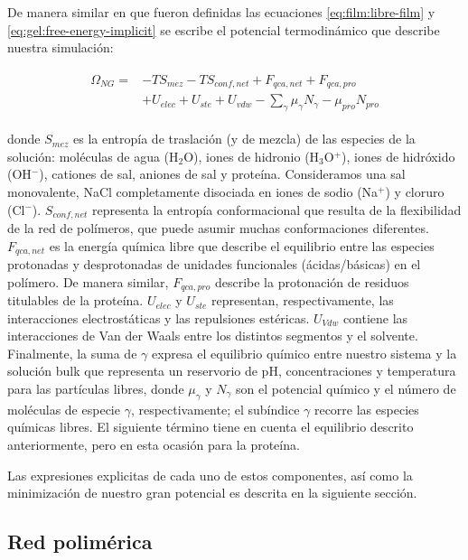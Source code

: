 De manera similar en que fueron definidas las ecuaciones \ref{eq:film:libre-film} y \ref{eq:gel:free-energy-implicit} se escribe el potencial termodin\'amico que describe nuestra simulaci\'on:

\begin{align}
\begin{aligned}
\Omega_{NG}=& -TS_{mez} -TS_{conf,net} + F_{qca,net} + F_{qca,pro}\\
& + U_{elec} + U_{ste} + U_{vdw} - \sum_{\gamma}{\mu_\gamma N_\gamma} - \mu_{pro} N_{pro}
\end{aligned}
\label{eq:esf:semicano}
\end{align}


\noindent donde $S_{mez}$ es la entrop\'ia de traslaci\'on (y de mezcla) de las especies de la soluci\'on: mol\'eculas de agua (H$_2$O), iones de hidronio (H$_3$O$^+$), iones de hidr\'oxido (OH$^- $), cationes de sal, aniones de sal y prote\'ina.
Consideramos una sal monovalente, NaCl completamente disociada en iones de sodio (Na$^+$) y cloruro (Cl$^-$).
$S_{conf,net}$ representa la entrop\'ia conformacional que resulta de la flexibilidad de la red de pol\'imeros, que puede asumir muchas conformaciones diferentes.
$F_{qca,net}$ es la energ\'ia qu\'imica libre que describe el equilibrio entre las especies protonadas y desprotonadas de unidades funcionales (\'acidas/b\'asicas) en el pol\'imero.
De manera similar, $F_{qca,pro}$ describe la protonaci\'on de residuos titulables de la prote\'ina.
$U_{elec}$ y $U_{ste}$ representan, respectivamente, las interacciones electrost\'aticas y las repulsiones est\'ericas.
$U_{Vdw}$ contiene las interacciones de Van der Waals entre los distintos segmentos y el solvente.
Finalmente, la suma de $\gamma$ expresa el equilibrio qu\'imico entre nuestro sistema y la soluci\'on bulk que representa un reservorio de pH, concentraciones y temperatura para las part\'iculas libres, donde $\mu_\gamma$ y $N_\gamma$ son el potencial qu\'imico y el n\'umero de mol\'eculas de especie $\gamma$, respectivamente;
el sub\'indice $\gamma$ recorre las especies qu\'imicas libres.
El siguiente t\'ermino tiene en cuenta el equilibrio descrito anteriormente, pero en esta ocasi\'on para la prote\'ina.

Las expresiones explicitas de cada uno de estos componentes, as\'i como la minimizaci\'on de nuestro gran potencial es descrita en la siguiente secci\'on.



\subsection{Red polim\'erica}\label{sec:esf:tm}

